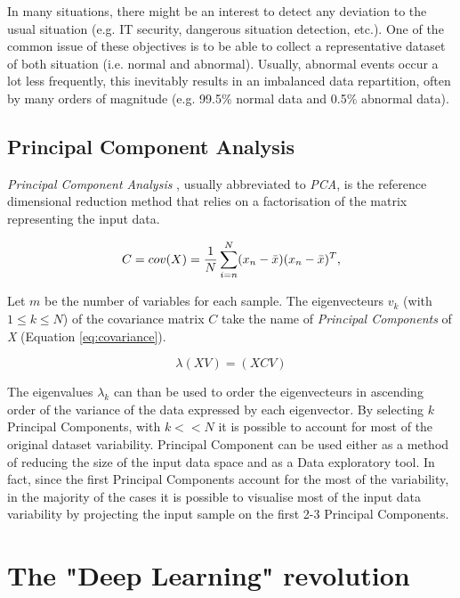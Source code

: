 In many situations, there might be an interest to detect any deviation to the usual situation (e.g.
IT security, dangerous situation detection, etc.). One of the common issue of these objectives
is to be able to collect a representative dataset of both situation (i.e. normal and abnormal).
Usually, abnormal events occur a lot less frequently, this inevitably results in an imbalanced data
repartition, often by many orders of magnitude (e.g. 99.5\% normal data and 0.5\% abnormal data).


\subsection{Principal Component Analysis} \label{Principal Component Analysis}

\textit{Principal Component Analysis} \citep{pearson1901liii}\citep{hotelling1933analysis}, usually abbreviated to \textit{PCA}, is the reference dimensional reduction method that relies on a factorisation of the matrix representing the input data.

\begin{equation} \label{eq:covariance}
    C = cov(X) = \frac{1}{N} \sum_{i=n}^{N} (x_{n} - \Bar{x})(x_{n} - \Bar{x})^{T},
\end{equation}

Let $m$ be the number of variables for each sample. The eigenvecteurs $v_{k}$ (with $1 \leqslant k \leqslant N$) of the covariance matrix $C$ take the name of \textit{Principal Components} of \textit{X} (Equation \ref{eq:covariance}).

\begin{equation}
    \lambda(XV) = (XCV) 
\end{equation}

The eigenvalues $\lambda_{k}$ can than be used to order the eigenvecteurs in ascending order of the variance of the data expressed by each eigenvector. By selecting $k$ Principal Components, with $k << N$ it is possible to account for most of the original dataset variability. Principal Component can be used either as a method of reducing the size of the input data space and as a Data exploratory tool. In fact, since the first Principal Components account for the most of the variability, in the majority of the cases it is possible to visualise most of the input data variability by projecting the input sample on the first 2-3 Principal Components. 


\section{The "Deep Learning" revolution}

